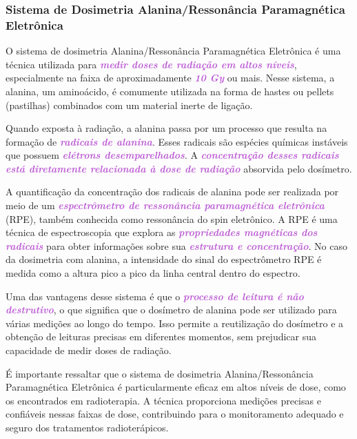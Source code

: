 \documentclass[11pt,a4paper]{article}
\begin{document}
\subsubsection*{ Sistema de Dosimetria Alanina/Ressonância Paramagnética Eletrônica}

	O sistema de dosimetria Alanina/Ressonância Paramagnética Eletrônica é uma técnica utilizada para \textcolor{MediumOrchid}{\textit{\textbf{medir doses de radiação em altos níveis}}}, especialmente na faixa de aproximadamente \textcolor{MediumOrchid}{\textit{\textbf{10 Gy}}} ou mais. Nesse sistema, a alanina, um aminoácido, é comumente utilizada na forma de hastes ou pellets (pastilhas) combinados com um material inerte de ligação.

	Quando exposta à radiação, a alanina passa por um processo que resulta na formação de \textcolor{MediumOrchid}{\textit{\textbf{radicais de alanina}}}. Esses radicais são espécies químicas instáveis que possuem \textcolor{MediumOrchid}{\textit{\textbf{elétrons desemparelhados}}}. A \textcolor{MediumOrchid}{\textit{\textbf{concentração desses radicais está diretamente relacionada à dose de radiação}}} absorvida pelo dosímetro.

	A quantificação da concentração dos radicais de alanina pode ser realizada por meio de um \textcolor{MediumOrchid}{\textit{\textbf{espectrômetro de ressonância paramagnética eletrônica}}} (RPE), também conhecida como ressonância do spin eletrônico. A RPE é uma técnica de espectroscopia que explora as \textcolor{MediumOrchid}{\textit{\textbf{propriedades magnéticas dos radicais}}} para obter informações sobre sua \textcolor{MediumOrchid}{\textit{\textbf{estrutura e concentração}}}. No caso da dosimetria com alanina, a intensidade do sinal do espectrômetro RPE é medida como a altura pico a pico da linha central dentro do espectro.

	Uma das vantagens desse sistema é que o \textcolor{MediumOrchid}{\textit{\textbf{processo de leitura é não destrutivo}}}, o que significa que o dosímetro de alanina pode ser utilizado para várias medições ao longo do tempo. Isso permite a reutilização do dosímetro e a obtenção de leituras precisas em diferentes momentos, sem prejudicar sua capacidade de medir doses de radiação.

	É importante ressaltar que o sistema de dosimetria Alanina/Ressonância Paramagnética Eletrônica é particularmente eficaz em altos níveis de dose, como os encontrados em radioterapia. A técnica proporciona medições precisas e confiáveis nessas faixas de dose, contribuindo para o monitoramento adequado e seguro dos tratamentos radioterápicos.
\end{document}
